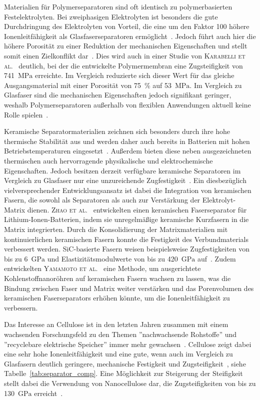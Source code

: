 Materialien für Polymerseparatoren sind oft identisch zu polymerbasierten Festelektrolyten. Bei zweiphasigen Elektrolyten ist besonders die gute Durchdringung des Elektrolyten von Vorteil, die eine um den Faktor 100 höhere Ionenleitfähigkeit als Glasfaserseparatoren ermöglicht~\cite{Wang2021a}. Jedoch führt auch hier die höhere Porosität zu einer Reduktion der mechanischen Eigenschaften und stellt somit einen Zielkonflikt dar~\cite{Ahankari2022}. Dies wird auch in einer Studie von \textsc{Karabelli et al.}~\cite{Karabelli2011} deutlich, bei der die entwickelte Polymermembran eine Zugsteifigkeit von 741~$\si{\MPa}$ erreichte. Im Vergleich reduzierte sich dieser Wert für das gleiche Ausgangsmaterial mit einer Porosität von 75~\% auf 53~$\si{\MPa}$. Im Vergleich zu Glasfaser sind die mechanischen Eigenschaften jedoch signifikant geringer, weshalb Polymerseparatoren außerhalb von flexiblen Anwendungen aktuell keine Rolle spielen~\cite{Zschiebsch2024}.

Keramische Separatormaterialien zeichnen sich besonders durch ihre hohe thermische Stabilität aus und werden daher auch bereits in Batterien mit hohen Betriebstemperaturen eingesetzt~\cite{Qin2017,Cheong2012}. Außerdem bieten diese neben ausgezeichneten thermischen auch hervorragende physikalische und elektrochemische Eigenschaften. Jedoch besitzen derzeit verfügbare keramische Separatoren im Vergleich zu Glasfaser nur eine unzureichende Zugfestigkeit~\cite{Qin2017}. Ein diesbezüglich vielversprechender Entwicklungsansatz ist dabei die Integration von keramischen Fasern, die sowohl als Separatoren als auch zur Verstärkung der Elektrolyt-Matrix dienen. \textsc{Zhao et al.}~\cite{Zhao2017} entwickelten einen keramischen Faserseparator für Lithium-Ionen-Batterien, indem sie unregelmäßige keramische Kurzfasern in die Matrix integrierten. Durch die Konsolidierung der Matrixmaterialien mit kontinuierlichen keramischen Fasern konnte die Festigkeit des Verbundmaterials verbessert werden. SiC-basierte Fasern weisen beispielsweise Zugfestigkeiten von bis zu 6~$\si{\GPa}$ und Elastizitätsmodulwerte von bis zu 420~$\si{\GPa}$ auf~\cite{Seydibeyoglu2017}. Zudem entwickelten \textsc{Yamamoto et al.}~\cite{Yamamoto2009} eine Methode, um ausgerichtete Kohlenstoffnanoröhren auf keramischen Fasern wachsen zu lassen, was die Bindung zwischen Faser und Matrix weiter verstärken und das Porenvolumen des keramischen Faserseparators erhöhen könnte, um die Ionenleitfähigkeit zu verbessern.

Das Interesse an Cellulose ist in den letzten Jahren zusammen mit einem wachsenden Forschungsfeld zu den Themen ''nachwachsende Rohstoffe'' und ''recyclebare elektrische Speicher'' immer mehr gewachsen~\cite{Liang2018,Teng2020}. Cellulose zeigt dabei eine sehr hohe Ionenleitfähigkeit und eine gute, wenn auch im Vergleich zu Glasfasern deutlich geringere, mechanische Festigkeit und Zugsteifigkeit~\cite{Xu2020}, siehe Tabelle~\ref{tab:separator_comp}. Eine Möglichkeit zur Steigerung der Steifigkeit stellt dabei die Verwendung von Nanocellulose dar, die Zugsteifigkeiten von bis zu 130~$\si{\GPa}$ erreicht~\cite{Dufresne2013,Zhang2019}.

